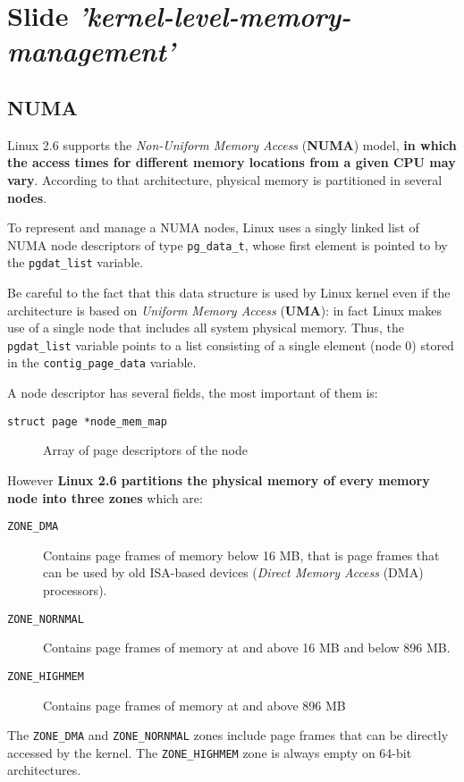 \documentclass[10pt,a4paper]{article}
\begin{document}
\section{Slide \textit{'kernel-level-memory-management'}}

\subsection{NUMA}

Linux 2.6 supports the \textit{Non-Uniform Memory Access} (\textbf{NUMA}) model, \textbf{in which the access times for different memory locations from a given CPU may vary}. According to that architecture,  physical memory is partitioned in several \textbf{nodes}.

To represent and manage a NUMA nodes, Linux uses a singly linked list of NUMA node descriptors of type \texttt{pg\_data\_t}, whose first element is pointed to by the \texttt{pgdat\_list} variable. 

Be careful to the fact that this data structure is used by Linux kernel even if the architecture is based on \textit{Uniform Memory Access} (\textbf{UMA}): in fact Linux makes use of a single node that includes all system physical memory. Thus, the \texttt{pgdat\_list} variable points to a list consisting of a single element (node 0) stored in the \texttt{contig\_page\_data} variable.

A node descriptor has several fields, the most important of them is:
\begin{description}
\item[\texttt{struct page *node\_mem\_map}] Array of page descriptors of the node
\end{description}

However \textbf{Linux 2.6 partitions the physical memory of every memory node into three zones} which are:
\begin{description}
\item[\texttt{ZONE\_DMA}] Contains page frames of memory below 16 MB, that is page frames that can be used by old ISA-based devices (\textit{Direct Memory Access} (DMA) processors).
\item[\texttt{ZONE\_NORNMAL}] Contains page frames of memory at and above 16 MB and below 896 MB.
\item[\texttt{ZONE\_HIGHMEM}] Contains page frames of memory at and above 896 MB
\end{description}

The \texttt{ZONE\_DMA} and \texttt{ZONE\_NORNMAL} zones include page frames that can be directly accessed by the kernel. The \texttt{ZONE\_HIGHMEM} zone is always empty on 64-bit architectures.
\end{document}
